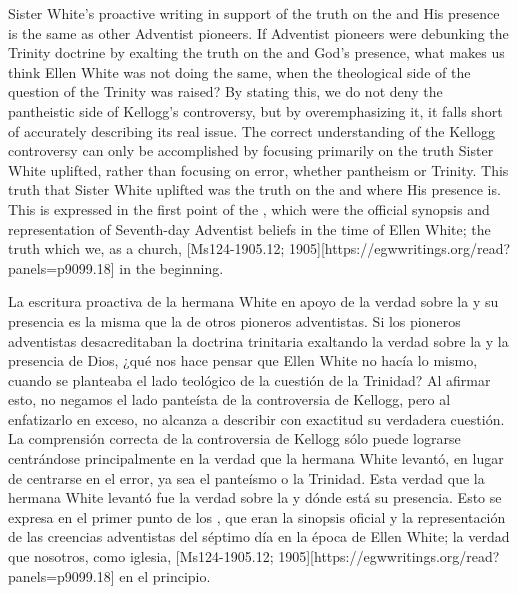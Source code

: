 Sister White’s proactive writing in support of the truth on the  and His presence is the same as other Adventist pioneers. If Adventist pioneers were debunking the Trinity doctrine by exalting the truth on the  and God’s presence, what makes us think Ellen White was not doing the same, when the theological side of the question of the Trinity was raised? By stating this, we do not deny the pantheistic side of Kellogg’s controversy, but by overemphasizing it, it falls short of accurately describing its real issue. The correct understanding of the Kellogg controversy can only be accomplished by focusing primarily on the truth Sister White uplifted, rather than focusing on error, whether pantheism or Trinity. This truth that Sister White uplifted was the truth on the  and where His presence is. This is expressed in the first point of the , which were the official synopsis and representation of Seventh-day Adventist beliefs in the time of Ellen White; the truth which we, as a church, [Ms124-1905.12; 1905][https://egwwritings.org/read?panels=p9099.18] in the beginning.


La escritura proactiva de la hermana White en apoyo de la verdad sobre la  y su presencia es la misma que la de otros pioneros adventistas. Si los pioneros adventistas desacreditaban la doctrina trinitaria exaltando la verdad sobre la  y la presencia de Dios, ¿qué nos hace pensar que Ellen White no hacía lo mismo, cuando se planteaba el lado teológico de la cuestión de la Trinidad? Al afirmar esto, no negamos el lado panteísta de la controversia de Kellogg, pero al enfatizarlo en exceso, no alcanza a describir con exactitud su verdadera cuestión. La comprensión correcta de la controversia de Kellogg sólo puede lograrse centrándose principalmente en la verdad que la hermana White levantó, en lugar de centrarse en el error, ya sea el panteísmo o la Trinidad. Esta verdad que la hermana White levantó fue la verdad sobre la  y dónde está su presencia. Esto se expresa en el primer punto de los , que eran la sinopsis oficial y la representación de las creencias adventistas del séptimo día en la época de Ellen White; la verdad que nosotros, como iglesia, [Ms124-1905.12; 1905][https://egwwritings.org/read?panels=p9099.18] en el principio.


